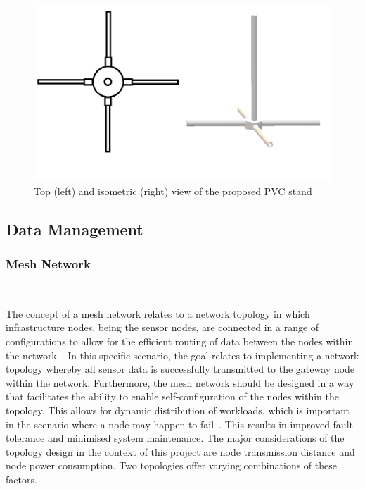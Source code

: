 \documentclass[10pt,twocolumn]{witseiepaper}
\begin{document}
		\begin{figure}
			\centering
			\includegraphics[width=1\columnwidth]{media/topIsoStand.png}
			\caption{Top (left) and isometric (right) view of the proposed PVC stand}
			\raggedright
			\label{fig:stand}
		\end{figure}
	
	\subsection{Data Management}
		\subsubsection{Mesh Network} $   $
		
			The concept of a mesh network relates to a network topology in which infrastructure nodes, being the sensor nodes, are connected in a range of configurations to allow for the efficient routing of data between the nodes within the network~\cite{mesh}. In this specific scenario, the goal relates to implementing a network topology whereby all sensor data is successfully transmitted to the gateway node within the network. Furthermore, the mesh network should be designed in a way that facilitates the ability to enable self-configuration of the nodes within the topology. This allows for dynamic distribution of workloads, which is important in the scenario where a node may happen to fail~\cite{mesh}. This results in improved fault-tolerance and minimised system maintenance. The major considerations of the topology design in the context of this project are node transmission distance and node power consumption. Two topologies offer varying combinations of these factors.
			
\end{document}

